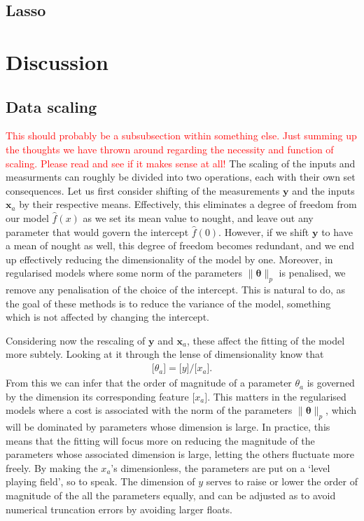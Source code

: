 \documentclass[twocolumn,english,notitlepage]{article}
\newcommand{\comment}[1]{\textcolor{red}{#1}}
\renewcommand{\vec}[1]{\boldsymbol{#1}}
\renewcommand{\norm}[2][]{\ensuremath{\|#2\|_{#1}}}
\newcommand{\dimof}[1]{\bigl[#1\bigr]}
\begin{document}
    \subsection{Lasso}
    
\section{Discussion}
    \subsection{Data scaling}
        \comment{This should probably be a subsubsection within something else. Just summing up the thoughts we have thrown around regarding the necessity and function of scaling.}
        \comment{Please read and see if it makes sense at all!}
        The scaling of the inputs and measurments can roughly be divided into two operations, each with their own set consequences. Let us first consider shifting of the measurements $\vec{y}$ and the inputs $\vec{x}_a$ by their respective means. Effectively, this eliminates a degree of freedom from our model $\hat{f}(x)$ as we set its mean value to nought, and leave out any parameter that would govern the intercept $\hat{f}(0)$. However, if we shift $\vec{y}$ to have a mean of nought as well, this degree of freedom becomes redundant, and we end up effectively reducing the dimensionality of the model by one. Moreover, in regularised models where some norm of the parameters $\norm[p]{\vec{\theta}}$ is penalised, we remove any penalisation of the choice of the intercept. This is natural to do, as the goal of these methods is to reduce the variance of the model, something which is not affected by changing the intercept.

        Considering now the rescaling of $\vec{y}$ and $\vec{x}_a$, these affect the fitting of the model more subtely. Looking at it through the lense of dimensionality know that
        \begin{align}
            \dimof{\theta_a} = \dimof{y} / \dimof{x_a}.
        \end{align}
        From this we can infer that the order of magnitude of a parameter $\theta_a$ is governed by the dimension its corresponding feature $\dimof{x_a}$. This matters in the regularised models where a cost is associated with the norm of the parameters $\norm[p]{\vec{\theta}}$, which will be dominated by parameters whose dimension is large. In practice, this means that the fitting will focus more on reducing the magnitude of the parameters whose associated dimension is large, letting the others fluctuate more freely. By making the $x_a$'s dimensionless, the parameters are put on a `level playing field', so to speak. The dimension of $y$ serves to raise or lower the order of magnitude of the all the parameters equally, and can be adjusted as to avoid numerical truncation errors by avoiding larger floats.
\end{document}
